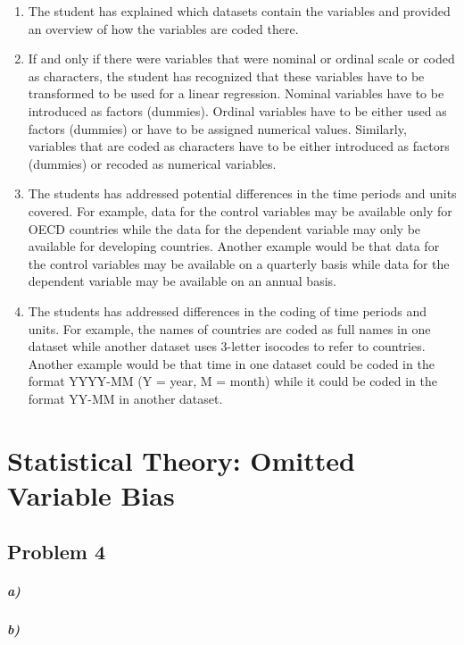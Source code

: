 \documentclass[12pt]{article}\usepackage[]{graphicx}\usepackage[]{color}
\begin{document}
\begin{enumerate}
	\item The student has explained which datasets contain the variables and provided an overview of how the variables are coded there.
	\item If and only if there were variables that were nominal or ordinal scale or coded as characters, the student has recognized that these variables have to be transformed to be used for a linear regression. Nominal variables have to be introduced as factors (dummies). Ordinal variables have to be either used as factors (dummies) or have to be assigned numerical values. Similarly, variables that are coded as characters have to be either introduced as factors (dummies) or recoded as numerical variables.
	\item The students has addressed potential differences in the time periods and units covered. For example, data for the control variables may be available only for OECD countries while the data for the dependent variable may only be available for developing countries. Another example would be that data for the control variables may be available on a quarterly basis while data for the dependent variable may be available on an annual basis.
	\item The students has addressed differences in the coding of time periods and units. For example, the names of countries are coded as full names in one dataset while another dataset uses 3-letter isocodes to refer to countries. Another example would be that time in one dataset could be coded in the format YYYY-MM (Y = year, M = month) while it could be coded in the format YY-MM in another dataset.
\end{enumerate}



\section*{Statistical Theory: Omitted Variable Bias}

\subsection*{Problem 4}

\subparagraph{a)}

\subparagraph{b)}
\end{document}
